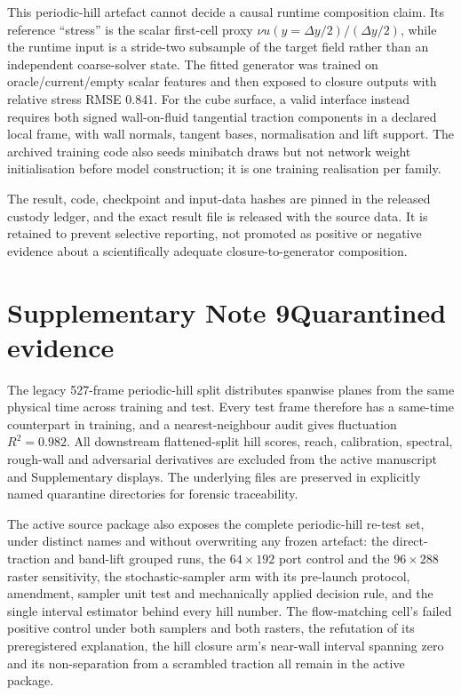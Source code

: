 \documentclass[11pt]{article}
\begin{document}
This periodic-hill artefact cannot decide a causal runtime composition claim. Its reference
``stress'' is the scalar first-cell proxy $\nu u(y=\Delta y/2)/(\Delta y/2)$, while the runtime
input is a stride-two subsample of the target field rather than an independent coarse-solver
state. The fitted generator was trained on oracle/current/empty scalar features and then exposed
to closure outputs with relative stress RMSE 0.841. For the cube surface, a valid interface instead
requires both signed wall-on-fluid tangential traction components in a declared local frame, with
wall normals, tangent bases, normalisation and lift support. The archived training code also seeds
minibatch draws but not network weight initialisation before model construction; it is one training
realisation per family.

The result, code, checkpoint and input-data hashes are pinned in the released custody
ledger, and the exact result file is released with the source data. It is retained to prevent
selective reporting, not promoted as positive or negative evidence about a scientifically adequate
closure-to-generator composition.

\section*{Supplementary Note 9\quad Quarantined evidence}\label{sec:s-quarantine}

The legacy 527-frame periodic-hill split distributes spanwise planes from the same physical time
across training and test. Every test frame therefore has a same-time counterpart in training, and
a nearest-neighbour audit gives fluctuation $R^2=0.982$. All downstream flattened-split hill
scores, reach, calibration, spectral, rough-wall and adversarial derivatives are excluded from the
active manuscript and Supplementary displays. The underlying files are preserved in explicitly
named quarantine directories for forensic traceability.

The active source package also exposes the complete periodic-hill re-test set, under distinct
names and without overwriting any frozen artefact: the direct-traction and band-lift grouped runs,
the $64\times192$ port control and
the $96\times288$ raster sensitivity, the stochastic-sampler arm with
its pre-launch protocol, amendment, sampler unit test and mechanically applied decision rule, and
the single interval estimator behind every hill number. The flow-matching cell's failed
positive control under both samplers and both rasters, the refutation of its preregistered
explanation, the hill closure arm's near-wall interval spanning zero and its non-separation from a
scrambled traction all remain in the active package.
\end{document}
